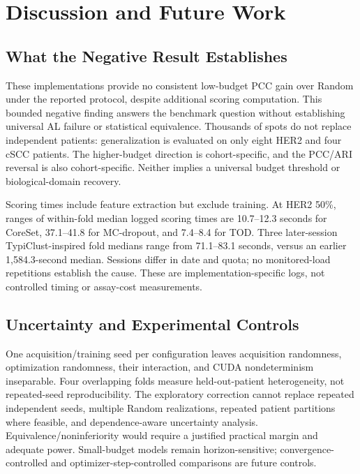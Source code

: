 \documentclass[]{spie}
\begin{document}
\section{Discussion and Future Work}
\label{sec:discussion}
\subsection{What the Negative Result Establishes}

These implementations provide no consistent low-budget PCC gain over Random under the reported protocol, despite additional scoring computation. This bounded negative finding answers the benchmark question without establishing universal AL failure or statistical equivalence. Thousands of spots do not replace independent patients: generalization is evaluated on only eight HER2 and four cSCC patients. The higher-budget direction is cohort-specific, and the PCC/ARI reversal is also cohort-specific. Neither implies a universal budget threshold or biological-domain recovery.

Scoring times include feature extraction but exclude training. At HER2 50\%, ranges of within-fold median logged scoring times are 10.7--12.3 seconds for CoreSet, 37.1--41.8 for MC-dropout, and 7.4--8.4 for TOD. Three later-session TypiClust-inspired fold medians range from 71.1--83.1 seconds, versus an earlier 1,584.3-second median. Sessions differ in date and quota; no monitored-load repetitions establish the cause. These are implementation-specific logs, not controlled timing or assay-cost measurements.

\subsection{Uncertainty and Experimental Controls}

One acquisition/training seed per configuration leaves acquisition randomness, optimization randomness, their interaction, and CUDA nondeterminism inseparable. Four overlapping folds measure held-out-patient heterogeneity, not repeated-seed reproducibility. The exploratory correction cannot replace repeated independent seeds, multiple Random realizations, repeated patient partitions where feasible, and dependence-aware uncertainty analysis. Equivalence/noninferiority would require a justified practical margin and adequate power. Small-budget models remain horizon-sensitive; convergence-controlled and optimizer-step-controlled comparisons are future controls.
\end{document}
